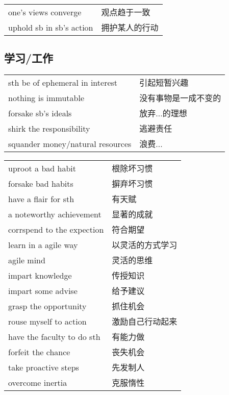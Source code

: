 \begin{tabular}{ll}
    one's views converge     & 观点趋于一致  \\
    uphold sb in sb's action & 拥护某人的行动 \\
\end{tabular}

\subsection{学习/工作}

\begin{tabular}{ll}
    sth be of ephemeral in interest  & 引起短暂兴趣     \\
    nothing is immutable             & 没有事物是一成不变的 \\
    forsake sb's ideals              & 放弃...的理想   \\
    shirk the responsibility         & 逃避责任       \\
    squander money/natural resources & 浪费...      \\
\end{tabular}

\begin{tabular}{ll}
    uproot a bad habit         & 根除坏习惯    \\
    forsake bad habits         & 摒弃坏习惯    \\
    have a flair for sth       & 有天赋      \\
    a noteworthy achievement   & 显著的成就    \\
    corrspend to the expection & 符合期望     \\
    learn in a agile way       & 以灵活的方式学习 \\
    agile mind                 & 灵活的思维    \\
    impart knowledge           & 传授知识     \\
    impart some advise         & 给予建议     \\
    grasp the opportunity      & 抓住机会     \\
    rouse myself to action     & 激励自己行动起来 \\
    have the faculty to do sth & 有能力做     \\
    forfeit the chance         & 丧失机会     \\
    take proactive steps       & 先发制人     \\
    overcome inertia           & 克服惰性     \\
\end{tabular}

